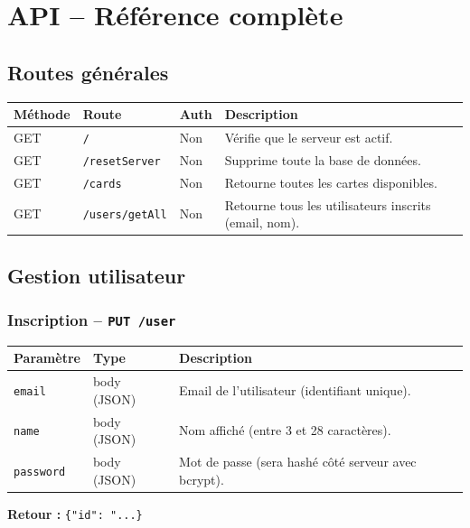 \documentclass[12pt,a4paper]{article}
\begin{document}
\section{API -- Référence complète}

\subsection{Routes générales}

\begin{tabularx}{\textwidth}{l l l X}
\toprule
\textbf{Méthode} & \textbf{Route} & \textbf{Auth} & \textbf{Description} \\
\midrule
GET & \texttt{/} & Non & Vérifie que le serveur est actif. \\
GET & \texttt{/resetServer} & Non & Supprime toute la base de données. \\
GET & \texttt{/cards} & Non & Retourne toutes les cartes disponibles. \\
GET & \texttt{/users/getAll} & Non & Retourne tous les utilisateurs inscrits (email, nom). \\
\bottomrule
\end{tabularx}

\subsection{Gestion utilisateur}

\subsubsection{Inscription -- \texttt{PUT /user}}

\begin{tabularx}{\textwidth}{l l X}
\toprule
\textbf{Paramètre} & \textbf{Type} & \textbf{Description} \\
\midrule
\texttt{email} & body (JSON) & Email de l'utilisateur (identifiant unique). \\
\texttt{name} & body (JSON) & Nom affiché (entre 3 et 28 caractères). \\
\texttt{password} & body (JSON) & Mot de passe (sera hashé côté serveur avec bcrypt). \\
\bottomrule
\end{tabularx}

\vspace{0.2cm}
\textbf{Retour :} \texttt{\{"id": "...\}}
\end{document}
